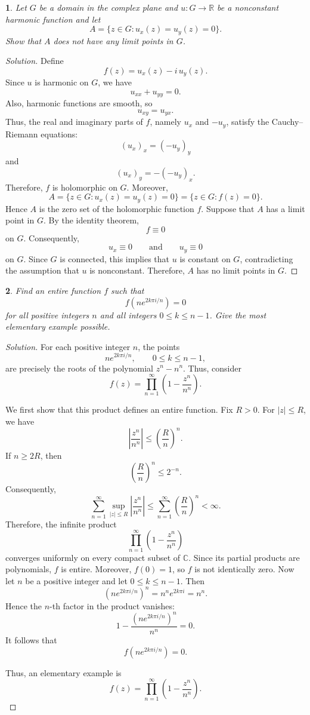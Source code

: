 \documentclass[12pt, a4paper]{report}
\theoremstyle{spaced}
\newtheorem{exercise}{}
\begin{document}
\begin{exercise}
	Let \(G\) be a domain in the complex plane and \(u:G\to\mathbb{R}\) be a
	nonconstant harmonic function and let
	\[
		A=\{z\in G:u_x(z)=u_y(z)=0\}.
	\]
	Show that \(A\) does not have any limit points in \(G\).
\end{exercise}
\begin{proof}[Solution]
	Define
	\[
		f(z)=u_x(z)-i\,u_y(z).
	\]
	Since \(u\) is harmonic on \(G\), we have
	\[
		u_{xx}+u_{yy}=0.
	\]
	Also, harmonic functions are smooth, so
	\[
		u_{xy}=u_{yx}.
	\]
	Thus, the real and imaginary parts of \(f\), namely \(u_x\) and
	\(-u_y\), satisfy the Cauchy--Riemann equations:
	\[
		(u_x)_x=(-u_y)_y
	\]
	and
	\[
		(u_x)_y=-(-u_y)_x.
	\]
	Therefore, \(f\) is holomorphic on \(G\).
	Moreover,
	\[
		A=\{z\in G:u_x(z)=u_y(z)=0\}
		=\{z\in G:f(z)=0\}.
	\]
	Hence \(A\) is the zero set of the holomorphic function \(f\).
	Suppose that \(A\) has a limit point in \(G\). By the identity theorem,
	\[
		f\equiv 0
	\]
	on \(G\). Consequently,
	\[
		u_x\equiv 0
		\qquad\text{and}\qquad
		u_y\equiv 0
	\]
	on \(G\). Since \(G\) is connected, this implies that \(u\) is constant
	on \(G\), contradicting the assumption that \(u\) is nonconstant.
	Therefore, \(A\) has no limit points in \(G\).
\end{proof}

\begin{exercise}
	Find an entire function \(f\) such that
	\[
		f\left(ne^{2k\pi i/n}\right)=0
	\]
	for all positive integers \(n\) and all integers \(0\le k\le n-1\). Give the
	most elementary example possible.
\end{exercise}

\begin{proof}[Solution]
	For each positive integer \(n\), the points
	\[
		ne^{2k\pi i/n}, \qquad 0\leq k\leq n-1,
	\]
	are precisely the roots of the polynomial \(z^n-n^n\). Thus, consider
	\[
		f(z)=\prod_{n=1}^{\infty}
		\left(1-\frac{z^n}{n^n}\right).
	\]

	We first show that this product defines an entire function. Fix \(R>0\).
	For \(|z|\leq R\), we have
	\[
		\left|\frac{z^n}{n^n}\right|
		\leq \left(\frac{R}{n}\right)^n.
	\]
	If \(n\geq 2R\), then
	\[
		\left(\frac{R}{n}\right)^n\leq 2^{-n}.
	\]
	Consequently,
	\[
		\sum_{n=1}^{\infty}
		\sup_{|z|\leq R}
		\left|\frac{z^n}{n^n}\right|
		\leq
		\sum_{n=1}^{\infty}
		\left(\frac{R}{n}\right)^n
		<\infty.
	\]
	Therefore, the infinite product
	\[
		\prod_{n=1}^{\infty}
		\left(1-\frac{z^n}{n^n}\right)
	\]
	converges uniformly on every compact subset of \(\mathbb{C}\). Since its
	partial products are polynomials, \(f\) is entire. Moreover, \(f(0)=1\), so
	\(f\) is not identically zero.
	Now let \(n\) be a positive integer and let \(0\leq k\leq n-1\). Then
	\[
		\left(ne^{2k\pi i/n}\right)^n
		=n^n e^{2k\pi i}
		=n^n.
	\]
	Hence the \(n\)-th factor in the product vanishes:
	\[
		1-\frac{\left(ne^{2k\pi i/n}\right)^n}{n^n}=0.
	\]
	It follows that
	\[
		f\left(ne^{2k\pi i/n}\right)=0.
	\]

	Thus, an elementary example is
	\[
		f(z)=\prod_{n=1}^{\infty}
		\left(1-\frac{z^n}{n^n}\right).
	\]
\end{proof}
\end{document}
